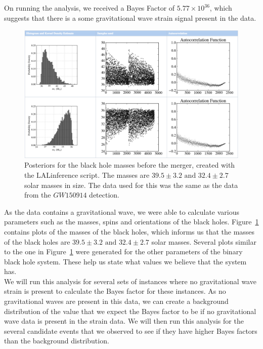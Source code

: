 \documentclass{article}
\begin{document}
 
  On running the analysis, we received a Bayes Factor of $5.77\times 10^{36}$, which suggests that there is a some gravitational wave strain signal present in the data.\\
 
      \begin{figure}[h]
      	\centering
      	\includegraphics[width=1\textwidth]{Figures/LALinferenceMasses.png} 
      	\caption{Posteriors for the black hole masses before the merger, created with the LALinference script. The masses are $39.5\pm3.2 \text{ and } 32.4\pm2.7$ solar masses in size. The data used for this was the same as the data from the $GW150914$ detection.}
      	\label{Fig:LALinferenceMasses}
      \end{figure}
      
      
 As the data contains a gravitational wave, we were able to calculate various parameters such as the masses, spins and orientations of the black holes. Figure~\ref{Fig:LALinferenceMasses} contains plots of the masses of the black holes, which informs us that the masses of the black holes are $39.5\pm3.2 \text{ and } 32.4\pm2.7$ solar masses. Several plots similar to the one in Figure~\ref{Fig:LALinferenceMasses} were generated for the other parameters of the binary black hole system. These help us state what values we believe that the system has. \\
 
 We will run this analysis for several sets of instances where no gravitational wave strain is present to calculate the Bayes factor for these instances. As no gravitational waves are present in this data, we can create a background distribution of the value that we expect the Bayes factor to be if no gravitational wave data is present in the strain data. We will then run this analysis for the several candidate events that we observed to see if they have higher Bayes factors than the background distribution. 
 
\end{document}
